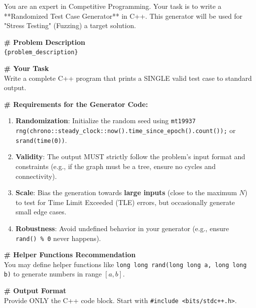\documentclass[11pt]{article}
\begin{document}
\begin{promptbox}
\small
You are an expert in Competitive Programming. Your task is to write a **Randomized Test Case Generator** in C++.
This generator will be used for "Stress Testing" (Fuzzing) a target solution.

\vspace{0.5em}
\noindent\textbf{\# Problem Description} \\
\texttt{\{problem\_description\}}

\vspace{0.5em}
\noindent\textbf{\# Your Task} \\
Write a complete C++ program that prints a SINGLE valid test case to standard output.

\noindent\textbf{\# Requirements for the Generator Code:}
\begin{enumerate}
    \setlength\itemsep{0em}
    \item \textbf{Randomization}: Initialize the random seed using \texttt{mt19937 rng(chrono::steady\_clock::now().time\_since\_epoch().count());} or \texttt{srand(time(0))}.
    \item \textbf{Validity}: The output MUST strictly follow the problem's input format and constraints (e.g., if the graph must be a tree, ensure no cycles and connectivity).
    \item \textbf{Scale}: Bias the generation towards \textbf{large inputs} (close to the maximum $N$) to test for Time Limit Exceeded (TLE) errors, but occasionally generate small edge cases.
    \item \textbf{Robustness}: Avoid undefined behavior in your generator (e.g., ensure \texttt{rand() \% 0} never happens).
\end{enumerate}

\vspace{0.5em}
\noindent\textbf{\# Helper Functions Recommendation} \\
You may define helper functions like \texttt{long long rand(long long a, long long b)} to generate numbers in range $[a, b]$.

\vspace{0.5em}
\noindent\textbf{\# Output Format} \\
Provide ONLY the C++ code block. Start with \texttt{\#include <bits/stdc++.h>}.
\end{promptbox}
\end{document}
